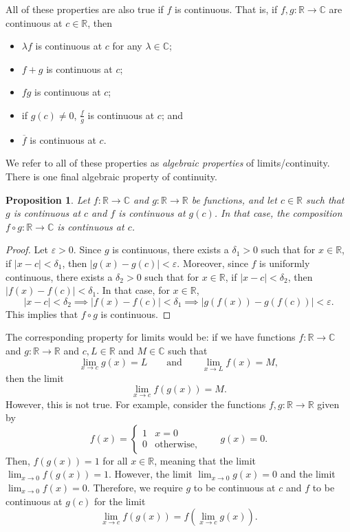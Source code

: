 \documentclass[a4paper, openany]{memoir}
\theoremstyle{definition}
\theoremstyle{plain}
\newtheorem{proposition}[definition]{Proposition}
\begin{document}
\noindent All of these properties are also true if $f$ is continuous. That is, if $f, g: \mathbb{R} \to \mathbb{C}$ are continuous at $c \in \mathbb{R}$, then
\begin{itemize}
    \item $\lambda f$ is continuous at $c$ for any $\lambda \in \mathbb{C}$;
    \item $f + g$ is continuous at $c$; 
    \item $fg$ is continuous at $c$; 
    \item if $g(c) \neq 0$, $\frac{f}{g}$ is continuous at $c$; and
    \item $\overline{f}$ is continuous at $c$.
\end{itemize}
We refer to all of these properties as \emph{algebraic properties} of limits/continuity. There is one final algebraic property of continuity.
\begin{proposition}
Let $f: \mathbb{R} \to \mathbb{C}$ and $g: \mathbb{R} \to \mathbb{R}$ be functions, and let $c \in \mathbb{R}$ such that $g$ is continuous at $c$ and $f$ is continuous at $g(c)$. In that case, the composition $f \circ g: \mathbb{R} \to \mathbb{C}$ is continuous at $c$.
\end{proposition}
\begin{proof}
Let $\varepsilon > 0$. Since $g$ is continuous, there exists a $\delta_1 > 0$ such that for $x \in \mathbb{R}$, if $|x - c| < \delta_1$, then $|g(x) - g(c)| < \varepsilon$. Moreover, since $f$ is uniformly continuous, there exists a $\delta_2 > 0$ such that for $x \in \mathbb{R}$, if $|x - c| < \delta_2$, then $|f(x) - f(c)| < \delta_1$. In that case, for $x \in \mathbb{R}$,
\[|x - c| < \delta_2 \implies |f(x) - f(c)| < \delta_1 \implies |g(f(x)) - g(f(c))| < \varepsilon.\]
This implies that $f \circ g$ is continuous.
\end{proof}
\noindent The corresponding property for limits would be: if we have functions $f: \mathbb{R} \to \mathbb{C}$ and $g: \mathbb{R} \to \mathbb{R}$ and $c,L \in \mathbb{R}$ and $M \in \mathbb{C}$ such that
\[\lim_{x \to c} g(x) = L \qquad \text{and} \qquad \lim_{x \to L} f(x) = M,\]
then the limit
\[\lim_{x \to c} f(g(x)) = M.\]
However, this is not true. For example, consider the functions $f, g: \mathbb{R} \to \mathbb{R}$ given by
\[f(x) = \begin{cases}
1 & x = 0 \\
0 & \text{otherwise},
\end{cases} \qquad g(x) = 0.\]
Then, $f(g(x)) = 1$ for all $x \in \mathbb{R}$, meaning that the limit $\lim_{x \to 0} f(g(x)) = 1$. However, the limit $\lim_{x \to 0} g(x) = 0$ and the limit $\lim_{x \to 0} f(x) = 0$. Therefore, we require $g$ to be continuous at $c$ and $f$ to be continuous at $g(c)$ for the limit
\[\lim_{x \to c} f(g(x)) = f(\lim_{x \to c} g(x)).\]
\end{document}
